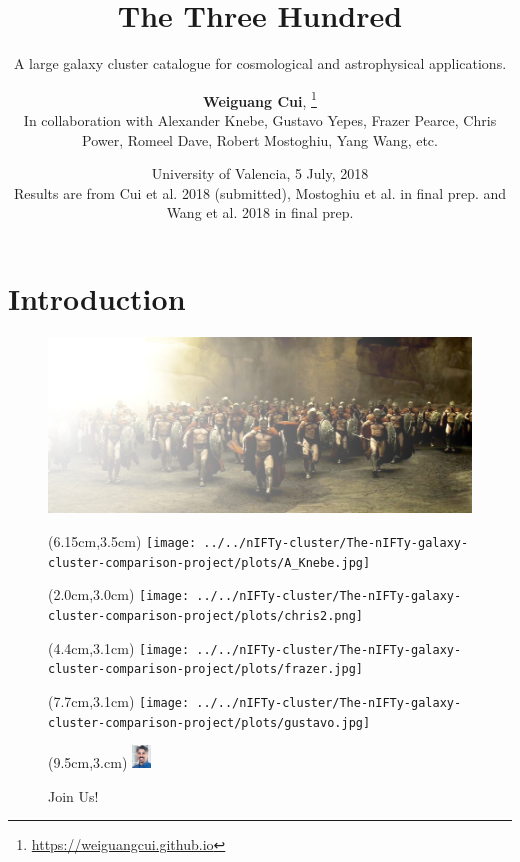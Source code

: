 \documentclass[aspectratio=43]{beamer}
\title[]{The Three Hundred}
\subtitle{A large galaxy cluster catalogue for cosmological and astrophysical applications.}
\author[Email: weiguang.cui@uam.es]{{\Large \bf Weiguang Cui},\inst{*} \footnote{\url{https://weiguangcui.github.io}} \\
  In collaboration with Alexander Knebe, Gustavo Yepes, Frazer Pearce, Chris Power, Romeel Dave, Robert Mostoghiu, Yang Wang, etc.}
\institute[]{
  \inst{*}
  Departamento de F\'isica Te\'{o}rica, \\
  Universidad Aut\'{o}noma de Madrid, 28049 Madrid, Spain
}
\date[]{University of Valencia, 5 July, 2018 \\ Results are from Cui et al. 2018 (submitted), Mostoghiu et al. in final prep. and Wang et al. 2018 in final prep.}
\begin{document}
  \frame{\titlepage}

\section{Introduction} \label{sec:1}
\begin{frame}
  \begin{figure}
    \includegraphics[width=\textwidth]{The300}
    \begin{textblock*}{0.5cm}(6.15cm,3.5cm) %
      \texttt{[image: ../../nIFTy-cluster/The-nIFTy-galaxy-cluster-comparison-project/plots/A\_Knebe.jpg]}
    \end{textblock*}
    \begin{textblock*}{0.5cm}(2.0cm,3.0cm) %
      \texttt{[image: ../../nIFTy-cluster/The-nIFTy-galaxy-cluster-comparison-project/plots/chris2.png]}
    \end{textblock*}
    \begin{textblock*}{0.5cm}(4.4cm,3.1cm) %
      \texttt{[image: ../../nIFTy-cluster/The-nIFTy-galaxy-cluster-comparison-project/plots/frazer.jpg]}
    \end{textblock*}
    \begin{textblock*}{0.5cm}(7.7cm,3.1cm) %
      \texttt{[image: ../../nIFTy-cluster/The-nIFTy-galaxy-cluster-comparison-project/plots/gustavo.jpg]}
    \end{textblock*}
    \begin{textblock*}{0.5cm}(9.5cm,3.cm) %
      \includegraphics[width=0.5cm]{Dave}
    \end{textblock*}
    \caption{Join Us!}
  \end{figure}
\end{frame}
\end{document}
